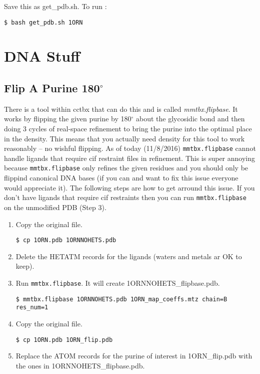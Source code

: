 \documentclass[12pt]{article}
\newcommand{\cmdline}[1]{\vspace{5mm} \noindent
\texttt{\$ #1}
\vspace{5mm}

}
\begin{document}
\noindent
Save this as get\_pdb.sh. To run :  

  \vspace{-6mm}
  \cmdline{bash get\_pdb.sh 1ORN}


\section{DNA Stuff}
\subsection{Flip A Purine 180$^{\circ}$}
There is a tool within cctbx that can do this and is called \textit{mmtbx.flipbase}. It works by flipping the given purine by 180$^{\circ}$ about the glycosidic bond and then doing 3 cycles of real-space refinement to bring the purine into the optimal place in the density. This means that you actually need density for this tool to work reasonably -- no wishful flipping. As of today (11/8/2016) \texttt{mmtbx.flipbase} cannot handle ligands that require cif restraint files in refinement. This is super annoying because \texttt{mmtbx.flipbase} only refines the given residues and you should only be flippind canonical DNA bases (if you can and want to fix this issue everyone would appreciate it). The following steps are how to get arround this issue. If you don't have ligands that require cif restraints then you can run \texttt{mmtbx.flipbase} on the unmodified PDB (Step 3).

\begin{enumerate}
  \item Copy the original file.
  
  \vspace{-6mm}
  \cmdline{cp 1ORN.pdb 1ORNNOHETS.pdb}
  \vspace{-6mm}
  \item Delete the HETATM records for the ligands (waters and metals ar OK to keep).
  \item Run \texttt{mmtbx.flipbase}. It will create 1ORNNOHETS\_flipbase.pdb.
  
  \vspace{-6mm}
  \cmdline{mmtbx.flipbase 1ORNNOHETS.pdb 1ORN\_map\_coeffs.mtz chain=B res\_num=1}
  \vspace{-6mm}
  \item Copy the original file.
  
  \vspace{-6mm}
  \cmdline{cp 1ORN.pdb 1ORN\_flip.pdb}
  \vspace{-6mm}
  \item Replace the ATOM records for the purine of interest in 1ORN\_flip.pdb with the ones in 1ORNNOHETS\_flipbase.pdb.
\end{enumerate}
\end{document}
